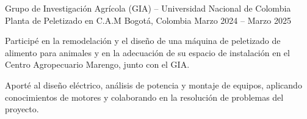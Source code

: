 \begin{cventries}
    \cventry
        {Grupo de Investigación Agrícola (GIA) -- Universidad Nacional de Colombia} %
        {Planta de Peletizado en C.A.M} %
        {Bogotá, Colombia} %
        {Marzo 2024 -- Marzo 2025} %
        {
            \begin{cvitems} %
                \item {Participé en la remodelación y el diseño de una máquina de peletizado de alimento para animales y en la adecuación de su espacio de instalación en el Centro Agropecuario Marengo, junto con el GIA.}
                \item {Aporté al diseño eléctrico, análisis de potencia y montaje de equipos, aplicando conocimientos de motores y colaborando en la resolución de problemas del proyecto.}
            \end{cvitems}
        }


\end{cventries}




